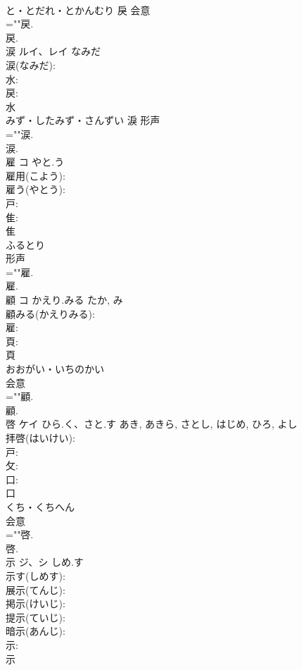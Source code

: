 \documentclass[8pt]{extreport}
\begin{document}
\begin{CJK}{UTF8}{min}
\\	と・とだれ・とかんむり	戾	会意 
\\	=""戻.
\\	戻.
\\	涙	ルイ、レイ	なみだ		
\\	涙(なみだ): 
\\	水: 
\\	戻: 
\\	水	
\\	みず・したみず・さんずい	淚	形声 
\\	=""涙.
\\	涙.
\\	雇	コ	やと.う		
\\	雇用(こよう): 
\\	雇う(やとう): 
\\	戸: 
\\	隹: 
\\	隹	
\\	ふるとり	
\\	形声 
\\	=""雇.
\\	雇.
\\	顧	コ	かえり.みる	たか, み	
\\	顧みる(かえりみる): 
\\	雇: 
\\	頁: 
\\	頁	
\\	おおがい・いちのかい	
\\	会意 
\\	=""顧.
\\	顧.
\\	啓	ケイ	ひら.く、さと.す	あき, あきら, さとし, はじめ, ひろ, よし	
\\	拝啓(はいけい): 
\\	戸: 
\\	攵: 
\\	口: 
\\	口	
\\	くち・くちへん	
\\	会意 
\\	=""啓.
\\	啓.
\\	示	ジ、シ	しめ.す		
\\	示す(しめす): 
\\	展示(てんじ): 
\\	掲示(けいじ): 
\\	提示(ていじ): 
\\	暗示(あんじ): 
\\	示: 
\\	示	

\end{CJK}
\end{document}
